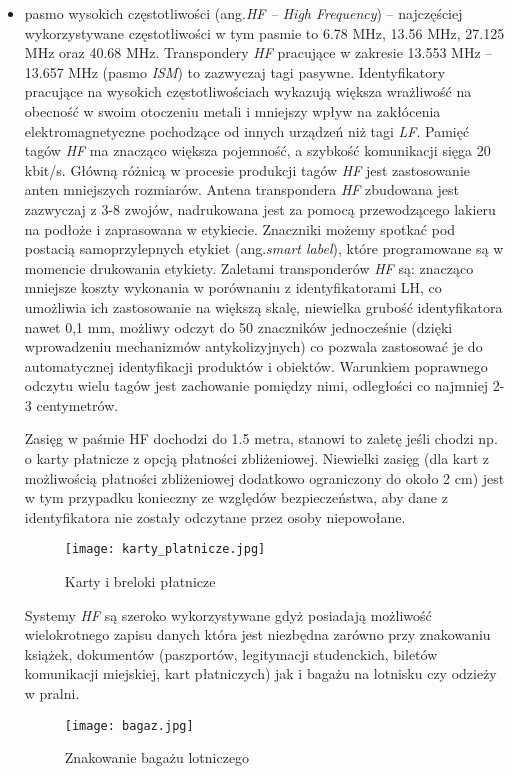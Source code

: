 \begin{itemize}
	\item pasmo wysokich częstotliwości (ang.\emph{HF – High Frequency}) – najczęściej wykorzystywane częstotliwości w tym pasmie to 6.78 MHz, 13.56 MHz, 27.125 MHz oraz 40.68 MHz. 
Transpondery \emph{HF} pracujące w zakresie 13.553 MHz – 13.657 MHz (pasmo \emph{ISM}) to zazwyczaj tagi pasywne. Identyfikatory pracujące na wysokich częstotliwościach wykazują większa wrażliwość na obecność w swoim otoczeniu metali i mniejszy wpływ na zakłócenia elektromagnetyczne pochodzące od  innych urządzeń niż tagi \emph{LF}. Pamięć tagów \emph{HF}  ma znacząco większa pojemność, a szybkość komunikacji sięga 20 kbit/s. Główną różnicą w procesie produkcji tagów \emph{HF} jest zastosowanie anten mniejszych rozmiarów. Antena transpondera \emph{HF} zbudowana jest zazwyczaj z 3-8 zwojów, nadrukowana jest za pomocą przewodzącego lakieru na podłoże i zaprasowana w etykiecie. Znaczniki możemy spotkać pod postacią samoprzylepnych etykiet (ang.\emph{smart label}), które programowane są w momencie drukowania etykiety. Zaletami transponderów \emph{HF} są: znacząco mniejsze koszty wykonania w porównaniu z identyfikatorami LH, co umożliwia ich zastosowanie na większą skalę, niewielka grubość identyfikatora nawet 0,1 mm, możliwy odczyt do 50 znaczników jednocześnie (dzięki wprowadzeniu mechanizmów antykolizyjnych) co pozwala zastosować je do automatycznej identyfikacji produktów i obiektów.  Warunkiem poprawnego odczytu wielu tagów jest zachowanie pomiędzy nimi, odległości co najmniej 2-3 centymetrów. 
	
	Zasięg w paśmie HF dochodzi do 1.5 metra, stanowi to zaletę jeśli chodzi np. o karty płatnicze z opcją płatności zbliżeniowej. Niewielki zasięg (dla kart z możliwością płatności zbliżeniowej dodatkowo ograniczony do około 2 cm) jest w tym przypadku konieczny ze względów bezpieczeństwa, aby dane z identyfikatora nie zostały odczytane przez osoby niepowołane. 

	\begin{figure}[h!]
	\centering
	    \texttt{[image: karty\_platnicze.jpg]}
	    \caption{Karty i breloki płatnicze}
	\end{figure}

	Systemy \emph{HF} są szeroko wykorzystywane gdyż posiadają możliwość wielokrotnego zapisu danych która jest niezbędna zarówno przy znakowaniu książek, dokumentów (paszportów, legitymacji studenckich, biletów komunikacji miejskiej, kart płatniczych) jak i bagażu na lotnisku czy odzieży w pralni.

	\begin{figure}[h!]
	\centering
	    \texttt{[image: bagaz.jpg]}
	    \caption{Znakowanie bagażu lotniczego}
	\end{figure}


\end{itemize}
